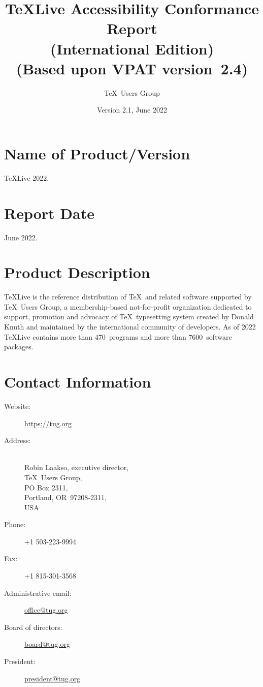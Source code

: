 \documentclass[titlepage]{article}
\begin{document}
\title{\TeX Live Accessibility Conformance Report\\
  (International Edition)\\
(Based upon VPAT\textsuperscript{\textregistered} version~2.4)}
\author{\TeX\ Users Group}
\date{Version 2.1, June 2022}
\maketitle

\newpage
{} 
\tableofcontents 

\newpage

\section{Name of Product/Version}
\label{sec:name}

\TeX Live 2022.


\section{Report Date}
\label{sec:date}

June 2022.


\section{Product Description}
\label{sec:description}

\TeX Live is the reference distribution of \TeX\ and related software
supported by \TeX\ Users Group, a membership-based not-for-profit
organization dedicated to support, promotion and advocacy of \TeX\
typesetting system created by Donald Knuth and maintained by the
international community of developers.  As of 2022 \TeX Live contains
more than 470~programs and more than 7600~software packages.

\section{Contact Information}
\label{sec:contact_info}

  \begin{description}
  \item[Website:]  \url{https://tug.org}
  \item[Address:] \leavevmode\\
    Robin Laakso, executive director,\\
    \TeX\ Users Group,\\
    PO Box 2311,\\
    Portland, OR~97208-2311,\\
    USA
  \item[Phone:] +1 503-223-9994
  \item[Fax:] +1 815-301-3568
  \item[Administrative email:] \href{mailto:office@tug.org}{office@tug.org}
  \item[Board of directors:] \href{mailto:board@tug.org}{board@tug.org}
  \item[President:] \href{mailto:president@tug.org}{president@tug.org}
  \end{description}
\end{document}
